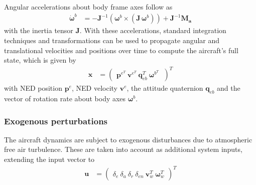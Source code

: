 \documentclass{ifacconf}
\begin{document}
Angular accelerations about body frame axes follow as
\begin{align}
\dot{\mathbf{\omega}}^b &= -\mathbf{J}^{-1} ({\mathbf{\omega}^b} 
\times 
(\mathbf{J} \,{\mathbf{\omega}^b}))
+ \mathbf{J}^{-1} 
\mathbf{M_a}
\end{align}
with the inertia tensor $\mathbf{J}$.
With these accelerations, standard integration techniques and transformations can be used to propagate angular and translational velocities and positions over time to compute the aircraft's full state, which is given by
\begin{align}
\mathbf{x} &= 
\begin{pmatrix}
\mathbf{p}^{e^T} \:
\mathbf{v}^{e^T} \:
\mathbf{q}^{T}_{eb} \:
\mathbf{\omega}^{b^T} \:
\end{pmatrix}^T 
\end{align}
with NED position $\mathbf{p}^e$, NED velocity $\mathbf{v}^e$, the attitude quaternion $\mathbf{q}_{eb}$ and the vector of rotation rate about body axes $\mathbf{\omega}^b$.
\subsubsection{Exogenous perturbations}
%
The aircraft dynamics are subject to exogenous disturbances due to atmospheric free air turbulence. These are taken into account as additional system inputs, extending the input vector to
%
\begin{align}
\mathbf{u} &= 
\begin{pmatrix}
\delta_{e} \:
\delta_{a} \:
\delta_{r} \:
\delta_{en} \:
\mathbf{v}_w^T \:
\mathbf{\omega}_w^T
\end{pmatrix}^T
\end{align}
\end{document}
